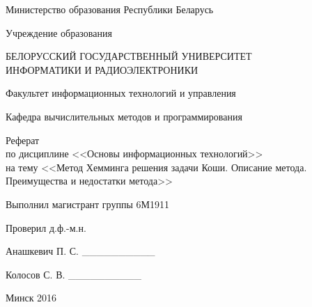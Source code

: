 \begin{titlepage}
\thispagestyle{empty}
\setlength{\parindent}{0cm} %

{\centering{}
  Министерство образования Республики Беларусь

  \smallskip
  Учреждение образования

  БЕЛОРУССКИЙ ГОСУДАРСТВЕННЫЙ УНИВЕРСИТЕТ \\
  ИНФОРМАТИКИ И РАДИОЭЛЕКТРОНИКИ

  \smallskip
  Факультет информационных технологий и управления

  \smallskip
  Кафедра вычислительных методов и программирования\par
}

\vspace{60mm}

{\centering{}
  Реферат \\
  по дисциплине <<Основы информационных технологий>> \\
  на тему <<Метод Хемминга решения задачи Коши. Описание метода. Преимущества и недостатки метода>>\par
}

\vspace{60mm}

\begin{minipage}{.55\linewidth}
  Выполнил магистрант группы 6М1911

  \smallskip
  Проверил д.ф.-м.н.
\end{minipage}
\hfill
\begin{minipage}{.4\linewidth}
  \begin{flushright}
    Анашкевич П. С. \_\_\_\_\_\_\_\_\_\_

    \smallskip
    Колосов С. В. \_\_\_\_\_\_\_\_\_\_ %
  \end{flushright}
\end{minipage}

\vfill
{\centering{}
  Минск 2016\par
}

\setlength{\parindent}{1.25cm} %
\end{titlepage}
